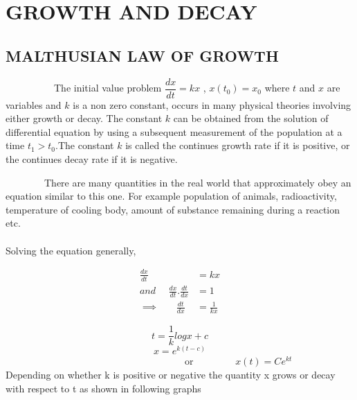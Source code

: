 \chapter[GROWTH AND DECAY]{\textbf{GROWTH AND DECAY}}
\thispagestyle{empty}

\section{MALTHUSIAN LAW OF GROWTH}
\par ~~~~~~~~~~The initial value problem $\dfrac{dx}{dt}=kx$ , $x(t_{0})=x_{0}$ where $t$ and $x$ are variables and $k$ is a non zero constant, occurs in many physical theories involving either growth or decay. The constant $k$ can be obtained from the solution of differential equation by using a subsequent measurement of the population at a time \(t_{1}>t_{0}\).The constant $k$ is called the continues growth rate if it is positive, or the continues decay rate if it is negative.

\par ~~~~~~~~There are many quantities in the real world that approximately obey an equation similar to this one. For example population  of animals, radioactivity, temperature of cooling body, amount of substance remaining during a reaction etc. \\
\\ Solving the equation generally,
\begin{center}
	\begin{eqnarray*}
			\frac{dx}{dt}&=kx   \\ 
			and ~~~~~~  
		{\frac{dx}{dt}}.{\frac{dt}{dx}}&=1  \\
		\implies ~~~~~~~~
		\frac{dt}{dx}&=\frac{1}{kx}
	\end{eqnarray*}
\end{center}
$$t=\dfrac{1}{k}logx+c$$
$$x=e^{k(t-c)}$$
~~~~~~~~~~~~~~~~~~~~~~~~~~~~~~~~~~~~~or~~~~~~~~
$x(t)=Ce^{kt}$ \\
Depending on whether k is positive or negative the quantity x grows or decay with respect to t as shown in following graphs


